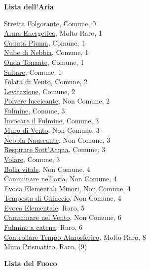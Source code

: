 \begin{multicols}{3}
{{\medskip\textbf{Lista dell'Aria}

\hyperlink{Stretta Folgorante}{Stretta Folgorante}, Comune, 0\\
\hyperlink{Arma Energetica}{Arma Energetica}, Molto Raro, 1\\
\hyperlink{Caduta Piuma}{Caduta Piuma}, Comune, 1\\
\hyperlink{Nube di Nebbia}{Nube di Nebbia}, Comune, 1\\
\hyperlink{Onda Tonante}{Onda Tonante}, Comune, 1\\
\hyperlink{Saltare}{Saltare}, Comune, 1\\
\hyperlink{Folata di Vento}{Folata di Vento}, Comune, 2\\
\hyperlink{Levitazione}{Levitazione}, Comune, 2\\
\hyperlink{Polvere luccicante}{Polvere luccicante}, Non Comune, 2\\
\hyperlink{Fulmine}{Fulmine}, Comune, 3\\
\hyperlink{Invocare il Fulmine}{Invocare il Fulmine}, Comune, 3\\
\hyperlink{Muro di Vento}{Muro di Vento}, Non Comune, 3\\
\hyperlink{Nebbia Nauseante}{Nebbia Nauseante}, Non Comune, 3\\
\hyperlink{Respirare Sott'Acqua}{Respirare Sott'Acqua}, Comune, 3\\
\hyperlink{Volare}{Volare}, Comune, 3\\
\hyperlink{Bolla vitale}{Bolla vitale}, Non Comune, 4\\
\hyperlink{Camminare nell'aria}{Camminare nell'aria}, Non Comune, 4\\
\hyperlink{Evoca Elementali Minori}{Evoca Elementali Minori}, Non Comune, 4\\
\hyperlink{Tempesta di Ghiaccio}{Tempesta di Ghiaccio}, Non Comune, 4\\
\hyperlink{Evoca Elementale}{Evoca Elementale}, Raro, 5\\
\hyperlink{Camminare nel Vento}{Camminare nel Vento}, Non Comune, 6\\
\hyperlink{Fulmine a catena}{Fulmine a catena}, Raro, 6\\
\hyperlink{Controllare Tempo Atmosferico}{Controllare Tempo Atmosferico}, Molto Raro, 8\\
\hyperlink{Muro Prismatico}{Muro Prismatico}, Raro, (9)

\medskip\textbf{Lista del Fuoco}

}}
\end{multicols}
